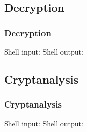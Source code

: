 
\subsection{Decryption}

\begin{frame}
\frametitle{Decryption}
Shell input: \decryptindemo
Shell output: \decryptoutdemo
\end{frame}


\subsection{Cryptanalysis}

\begin{frame}
\frametitle{Cryptanalysis}
Shell input: \cryptanalyzeindemo
Shell output: \cryptanalyzeoutdemo
\end{frame}
